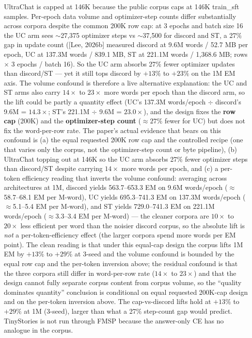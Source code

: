 \documentclass[11pt]{article}
\begin{document}
UltraChat is capped at 146K because the public corpus caps at 146K train\_sft samples. Per-epoch data volume and optimizer-step counts differ substantially across corpora despite the common 200K row cap: at 3 epochs and batch size 16 the UC arm sees $\sim$27,375 optimizer steps vs $\sim$37,500 for discord and ST, a 27\% gap in update count ([Lee, 2026b] measured discord at 9.6M words / 52.7 MB per epoch, UC at 137.3M words / 839.1 MB, ST at 221.1M words / 1,368.6 MB; rows $\times$ 3 epochs / batch 16). So the UC arm absorbs 27\% fewer optimizer updates than discord/ST --- yet it still tops discord by $+13\%$ to $+23\%$ on the 1M EM axis. The volume confound is therefore a live alternative explanation: the UC and ST arms also carry $14\times$ to $23\times$ more words per epoch than the discord arm, so the lift could be partly a quantity effect (UC's 137.3M words/epoch $\div$ discord's 9.6M = $14.3\times$; ST's 221.1M $\div$ 9.6M = $23.0\times$), and the design fixes the \textbf{row cap} (200K) and the \textbf{optimizer-step count} ($\approx 27\%$ fewer for UC) but does not fix the word-per-row rate. The paper's actual evidence that bears on this confound is (a) the equal requested 200K row cap and the controlled recipe (one that varies only the corpus, not the optimizer-step count or byte pipeline), (b) UltraChat topping out at 146K so the UC arm absorbs 27\% fewer optimizer steps than discord/ST despite carrying $14\times$ more words per epoch, and (c) a per-token efficiency reading that inverts the volume confound: averaging across architectures at 1M, discord yields 563.7--653.3 EM on 9.6M words/epoch ($\approx$58.7--68.1 EM per M-word), UC yields 695.3--741.3 EM on 137.3M words/epoch ($\approx$5.1--5.4 EM per M-word), and ST yields 729.0--741.3 EM on 221.1M words/epoch ($\approx$3.3--3.4 EM per M-word) --- the cleaner corpora are $10\times$ to $20\times$ less efficient per word than the noisier discord corpus, so the absolute lift is \emph{not} a per-token-efficiency effect (the larger corpora spend more words per EM point). The clean reading is that under this equal-cap design the corpus lifts 1M EM by $+13\%$ to $+29\%$ at 3-seed and the volume confound is bounded by the equal row cap and the per-token inversion above; the residual confound is that the three corpora still differ in word-per-row rate ($14\times$ to $23\times$) and that the design cannot fully separate corpus content from corpus volume, so the ``quality dominates quantity'' conclusion is conditional on equal requested 200K-cap design and on the per-token inversion above. The cap-vs-discord lifts hold at $+13\%$ to $+29\%$ at 1M (3-seed), larger than what a 27\% step-count gap would predict. TinyStories is not run through FMSP because the answer-only CE has no analogue in the corpus.
\end{document}
